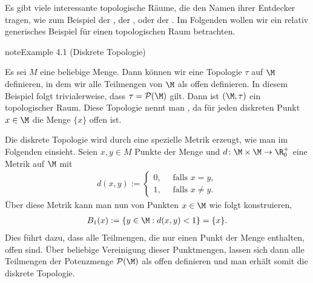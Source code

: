 \documentclass[letterpaper,10pt,german]{jupyterBook}
\begin{document}
\sphinxAtStartPar
Es gibt viele interessante topologische Räume, die den Namen ihrer Entdecker tragen, wie zum Beispiel der , der , oder der .
Im Folgenden wollen wir ein relativ generisches Beispiel für einen topologischen Raum betrachten.
\label{manifolds/manifolds_prelim:ex:diskreteTopologie}
\begin{sphinxadmonition}{note}{Example 4.1 (Diskrete Topologie)}



\sphinxAtStartPar
Es sei \(M\) eine beliebige Menge.
Dann können wir eine Topologie \(\tau\) auf \(\M\) definieren, in dem wir alle Teilmengen von \(\M\) als offen definieren.
In diesem Beispiel folgt trivialerweise, dass \(\tau = \mathcal{P}(\M)\) gilt.
Dann ist \((\M, \tau)\) ein topologischer Raum.
Diese Topologie nennt man , da für jeden diskreten Punkt \(x \in \M\) die Menge \(\lbrace x \rbrace\) offen ist.

\sphinxAtStartPar
Die diskrete Topologie wird durch eine spezielle Metrik erzeugt, wie man im Folgenden einsieht.
Seien \(x,y \in M\) Punkte der Menge und \(d \colon \M \times \M \rightarrow \R^+_0\) eine Metrik auf \(\M\) mit
\begin{equation*}
\begin{split}d(x,y) := \begin{cases} 0, \quad \text{ falls } x=y,\\ 1, \quad \text{ falls } x\neq y. \end{cases}\end{split}
\end{equation*}
\sphinxAtStartPar
Über diese Metrik kann man nun  von Punkten \(x \in \M\) wie folgt konstruieren,
\begin{equation*}
\begin{split}B_1(x) := \lbrace y \in \M : d(x,y) < 1 \rbrace = \lbrace x \rbrace.\end{split}
\end{equation*}
\sphinxAtStartPar
Dies führt dazu, dass alle Teilmengen, die nur einen Punkt der Menge enthalten, offen sind.
Über beliebige Vereinigung dieser Punktmengen, lassen sich dann alle Teilmengen der Potenzmenge \(\mathcal{P}(\M)\) als offen definieren und man erhält somit die diskrete Topologie.
\end{sphinxadmonition}
\end{document}
